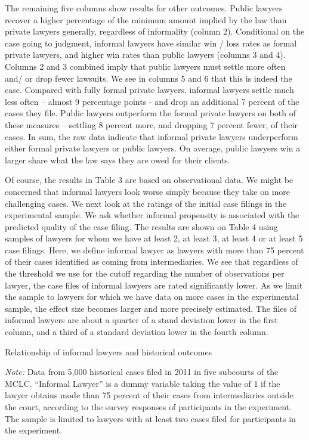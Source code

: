 \documentclass[12 pt]{article}
\newenvironment{figurenotes}[1][\footnotesize{Note}]{\begin{minipage}[t]{\linewidth}\footnotesize{\itshape#1: }}{\end{minipage}}
\begin{document}
The remaining five columns show results for other outcomes. Public lawyers recover a higher percentage of the minimum amount implied by the law than private lawyers generally, regardless of informality (column 2). Conditional on the case going to judgment, informal lawyers have similar win / loss rates as formal private lawyers, and higher win rates than public lawyers (columns 3 and 4). Columns 2 and 3 combined imply that public lawyers must settle more often and/ or drop fewer lawsuits. We see in columns 5 and 6 that this is indeed the case. Compared with fully formal private lawyers, informal lawyers settle much less often – almost 9 percentage points - and drop an additional 7 percent of the cases they file. Public lawyers outperform the formal private lawyers on both of these measures – settling 8 percent more, and dropping 7 percent fewer, of their cases. In sum, the raw data indicate that informal private lawyers underperform either formal private lawyers or public lawyers. On average, public lawyers win a larger share what the law says they are owed for their clients. 

Of course, the results in Table 3 are based on observational data. We might be concerned that informal lawyers look worse simply because they take on more challenging cases. We next look at the ratings of the initial case filings in the experimental sample. We ask whether informal propensity is associated with the predicted quality of the case filing. The results are shown on Table 4 using samples of lawyers for whom we have at least 2, at least 3, at least 4 or at least 5 case filings. Here, we define informal lawyer as lawyers with more than 75 percent of their cases identified as coming from intermediaries. We see that regardless of the threshold we use for the cutoff regarding the number of observations per lawyer, the case files of informal lawyers are rated significantly lower. As we limit the sample to lawyers for which we have data on more cases in the experimental sample, the effect size becomes larger and more precisely estimated. The files of informal lawyers are about a quarter of a stand deviation lower in the first column, and a third of a standard deviation lower in the fourth column. 


\begin{landscape}
\begin{table}[!ht]
    \caption{Relationship of informal lawyers and historical outcomes} %
    \label{tab:3}
    \center
    \notesize{}
    \begin{figurenotes}
    Data from 5,000 historical cases filed in 2011 in five subcourts of the MCLC. “Informal Lawyer” is a dummy variable taking the value of 1 if the lawyer obtains mode than 75 percent of their cases from intermediaries outside the court, according to the survey responses of participants in the experiment. The sample is limited to lawyers with at least two cases filed for participants in the experiment.
    \end{figurenotes}
  
\end{table}
\end{landscape}
\end{document}
